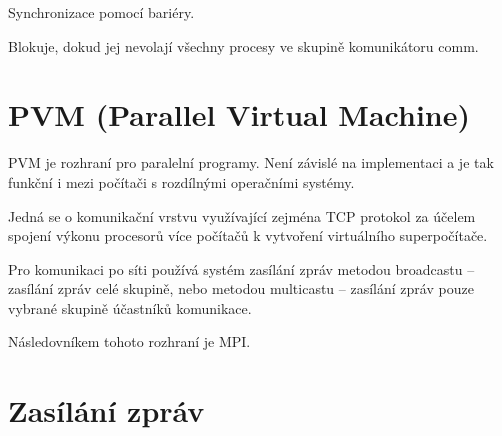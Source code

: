 \begin{compactitem}
    \item {} \begin{compactitem}
        \item Synchronizace pomocí bariéry.
        \item Blokuje, dokud jej nevolají všechny procesy ve skupině komunikátoru comm.
    \end{compactitem}
\end{compactitem}


\section{PVM (Parallel Virtual Machine)}

\begin{compactitem}
    \item PVM je rozhraní pro paralelní programy. Není závislé na implementaci a je tak funkční i mezi počítači s rozdílnými operačními systémy.

    \item Jedná se o komunikační vrstvu využívající zejména TCP protokol za účelem spojení výkonu procesorů více počítačů k vytvoření virtuálního superpočítače.

    \item Pro komunikaci po síti používá systém zasílání zpráv metodou broadcastu -- zasílání zpráv celé skupině, nebo metodou multicastu -- zasílání zpráv pouze vybrané skupině účastníků komunikace.

    \item Následovníkem tohoto rozhraní je MPI.
\end{compactitem}


\section{Zasílání zpráv}

